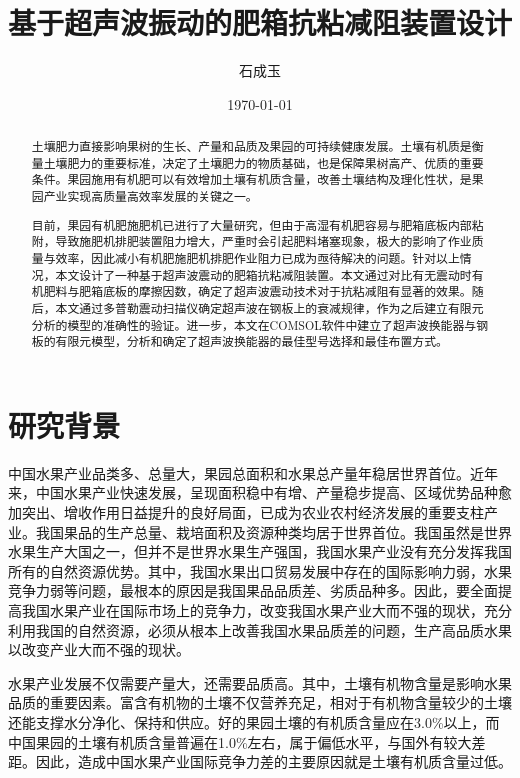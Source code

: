 \documentclass[fontset=windows,12pt,a4paper,titlepage,UTF8]{ctexart}
\author{石成玉}
\date{\today}
\title{基于超声波振动的肥箱抗粘减阻装置设计}
\begin{document}
\maketitle

\begin{abstract}

  土壤肥力直接影响果树的生长、产量和品质及果园的可持续健康发展。土壤有机质是衡量土壤肥力的重要标准，决定了土壤肥力的物质基础，也是保障果树高产、优质的重要条件。果园施用有机肥可以有效增加土壤有机质含量，改善土壤结构及理化性状，是果园产业实现高质量高效率发展的关键之一。

  目前，果园有机肥施肥机已进行了大量研究，但由于高湿有机肥容易与肥箱底板内部粘附，导致施肥机排肥装置阻力增大，严重时会引起肥料堵塞现象，极大的影响了作业质量与效率，因此减小有机肥施肥机排肥作业阻力已成为亟待解决的问题。针对以上情况，本文设计了一种基于超声波震动的肥箱抗粘减阻装置。本文通过对比有无震动时有机肥料与肥箱底板的摩擦因数，确定了超声波震动技术对于抗粘减阻有显著的效果。随后，本文通过多普勒震动扫描仪确定超声波在钢板上的衰减规律，作为之后建立有限元分析的模型的准确性的验证。进一步，本文在COMSOL软件中建立了超声波换能器与钢板的有限元模型，分析和确定了超声波换能器的最佳型号选择和最佳布置方式。

\end{abstract}

\tableofcontents

\newpage

\section{研究背景}

中国水果产业品类多、总量大，果园总面积和水果总产量年稳居世界首位。近年来，中国水果产业快速发展，呈现面积稳中有增、产量稳步提高、区域优势品种愈加突出、增收作用日益提升的良好局面，已成为农业农村经济发展的重要支柱产业。我国果品的生产总量、栽培面积及资源种类均居于世界首位。我国虽然是世界水果生产大国之一，但并不是世界水果生产强国，我国水果产业没有充分发挥我国所有的自然资源优势。其中，我国水果出口贸易发展中存在的国际影响力弱，水果竞争力弱等问题，最根本的原因是我国果品品质差、劣质品种多。因此，要全面提高我国水果产业在国际市场上的竞争力，改变我国水果产业大而不强的现状，充分利用我国的自然资源，必须从根本上改善我国水果品质差的问题，生产高品质水果以改变产业大而不强的现状。

水果产业发展不仅需要产量大，还需要品质高。其中，土壤有机物含量是影响水果品质的重要因素。富含有机物的土壤不仅营养充足，相对于有机物含量较少的土壤还能支撑水分净化、保持和供应。好的果园土壤的有机质含量应在3.0\%以上，而中国果园的土壤有机质含量普遍在1.0\%左右，属于偏低水平，与国外有较大差距。因此，造成中国水果产业国际竞争力差的主要原因就是土壤有机质含量过低。
\end{document}
